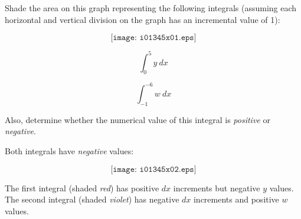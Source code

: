 

Shade the area on this graph representing the following integrals (assuming each horizontal and vertical division on the graph has an incremental value of 1):

$$\texttt{[image: i01345x01.eps]}$$

$$\int_{0}^{5} y \> dx$$

$$\int_{-1}^{-6} w \> dx$$

Also, determine whether the numerical value of this integral is {\it positive} or {\it negative}.







Both integrals have {\it negative} values:

$$\texttt{[image: i01345x02.eps]}$$

The first integral (shaded {\it red}) has positive $dx$ increments but negative $y$ values.  The second integral (shaded {\it violet}) has negative $dx$ increments and positive $w$ values.











